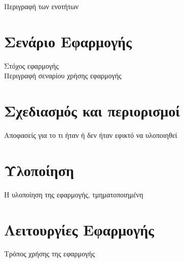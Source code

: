 
Περιγραφή των ενοτήτων

\section{Σενάριο Εφαρμογής}
Στόχος εφαρμογής\\
Περιγραφή σεναρίου χρήσης εφαρμογής

\section{Σχεδιασμός και περιορισμοί}
Αποφασείς για το τι ήταν ή δεν ήταν εφικτό να υλοποιηθεί

\section{Υλοποίηση}
Η υλοποίηση της εφαρμογής, τμηματοποιημένη

\section{Λειτουργίες Εφαρμογής}
Τρόπος χρήσης της εφαρμογής



